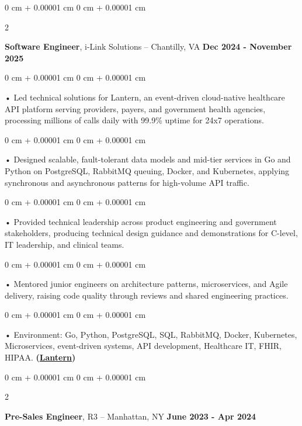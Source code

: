 \documentclass[10pt, letterpaper]{article}
\newenvironment{onecolentry}{
    \begin{adjustwidth}{
        0 cm + 0.00001 cm
    }{
        0 cm + 0.00001 cm
    }
}{
    \end{adjustwidth}
} %
\newenvironment{twocolentry}[2][]{
    \onecolentry
    \def\secondColumn{#2}
    \setcolumnwidth{\fill, 4.5 cm}
    \begin{paracol}{2}
}{
    \switchcolumn \raggedleft \secondColumn
    \end{paracol}
    \endonecolentry
} %
\begin{document}
        \vspace{0.1cm}

        \begin{twocolentry}{
            \textbf{Dec 2024 - November 2025}
        }
            \textbf{Software Engineer}, i-Link Solutions -- Chantilly, VA\end{twocolentry}


        \begin{onecolentry}
             • Led technical solutions for Lantern, an event-driven cloud-native healthcare API platform serving providers, payers, and government health agencies, processing millions of calls daily with 99.9\% uptime for 24x7 operations.
        \end{onecolentry}
        \begin{onecolentry}
             • Designed scalable, fault-tolerant data models and mid-tier services in Go and Python on PostgreSQL, RabbitMQ queuing, Docker, and Kubernetes, applying synchronous and asynchronous patterns for high-volume API traffic.
        \end{onecolentry}
        \begin{onecolentry}
             • Provided technical leadership across product engineering and government stakeholders, producing technical design guidance and demonstrations for C-level, IT leadership, and clinical teams.
        \end{onecolentry}
        \begin{onecolentry}
             • Mentored junior engineers on architecture patterns, microservices, and Agile delivery, raising code quality through reviews and shared engineering practices.
        \end{onecolentry}
        \begin{onecolentry}
             • Environment: Go, Python, PostgreSQL, SQL, RabbitMQ, Docker, Kubernetes, Microservices, event-driven systems, API development, Healthcare IT, FHIR, HIPAA. \textbf{(\href{https://lantern.healthit.gov/?tab=dashboard_tab}{Lantern})}
        \end{onecolentry}
        \vspace{0.1cm}

        \begin{twocolentry}{
            \textbf{June 2023 - Apr 2024}
        }
            \textbf{Pre-Sales Engineer}, R3 -- Manhattan, NY\end{twocolentry}
\end{document}
